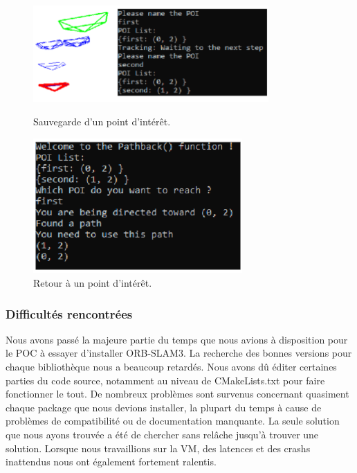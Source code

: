 \documentclass[11pt]{article}
\begin{document}
        \begin{figure}[!tbp]
          \centering
          \begin{minipage}[t]{0.4\textwidth}            
            \includegraphics[width=90mm]{Test3.png}    
            \caption{Sauvegarde d'un point d'intérêt.}
            \label{fig:Test3}
          \end{minipage}
          \hfill 
          \begin{minipage}[t]{0.4\textwidth}            
            \includegraphics[width=80mm]{Test4.png}    
            \caption{Retour à un point d'intérêt.}
            \label{fig:Test4}
          \end{minipage}
        \end{figure}     
        
      \pagebreak

      \subsubsection{Difficultés rencontrées}
        Nous avons passé la majeure partie du temps que nous avions à disposition pour le POC à essayer d'installer ORB-SLAM3. 
        La recherche des bonnes
        versions pour chaque bibliothèque nous a beaucoup retardés. Nous avons dû éditer certaines parties du code source, 
        notamment au niveau de CMakeLists.txt pour faire fonctionner le tout.
        De nombreux problèmes sont survenus concernant quasiment chaque package que nous devions installer, la plupart du temps à cause de
        problèmes de compatibilité ou de documentation manquante. La seule solution que nous ayons trouvée a été de chercher sans relâche jusqu'à
        trouver une solution.
        Lorsque nous travaillions sur la VM, des latences et des crashs inattendus nous ont également fortement ralentis.       
 
\end{document}
